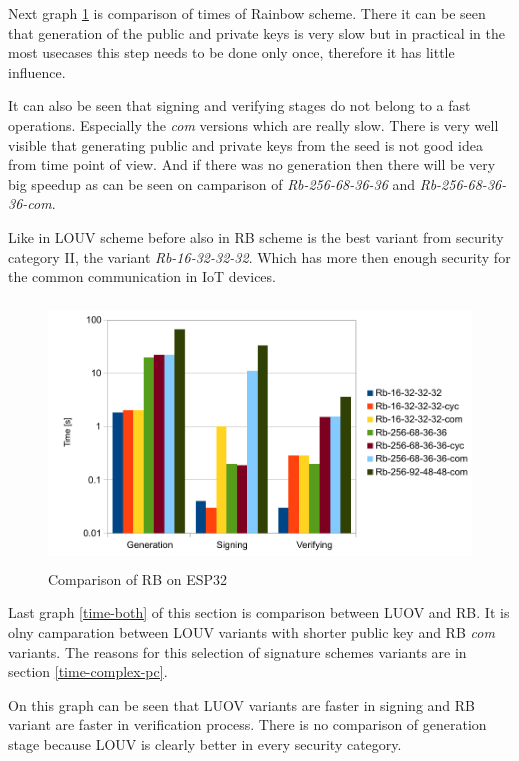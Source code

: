 \documentclass[thesis=M,english]{FITthesis}[2019/12/23]
\begin{document}
Next graph \ref{time-rb} is comparison of times of Rainbow scheme. There it can be seen that generation of the public and private keys is very slow but in practical in the most usecases this step needs to be done only once, therefore it has little influence.

\bigskip
\noindent
It can also be seen that signing and verifying stages do not belong to a fast operations. Especially the \textit{com} versions which are really slow. There is very well visible that generating public and private keys from the seed is not good idea from time point of view. And if there was no generation then there will be very big speedup as can be seen on camparison of \textit{Rb-256-68-36-36} and \textit{Rb-256-68-36-36-com}.

\bigskip
\noindent
Like in LOUV scheme before also in RB scheme is the best variant from security category II, the variant \textit{Rb-16-32-32-32}. Which has more then enough security for the common communication in IoT devices.

\begin{figure}[H]
\centering
\includegraphics[width=13cm,height=7cm]{images/time-rb.pdf}
\caption{Comparison of RB on ESP32}
\label{time-rb}
\end{figure}

\noindent
Last graph \ref{time-both} of this section is comparison between LUOV and RB. It is olny camparation between LOUV variants with shorter public key and RB \textit{com} variants. The reasons for this selection of signature schemes variants are in section \ref{time-complex-pc}.

\bigskip
\noindent
On this graph can be seen that LUOV variants are faster in signing and RB variant are faster in verification process. There is no comparison of generation stage because LOUV is clearly better in every security category.
\end{document}

